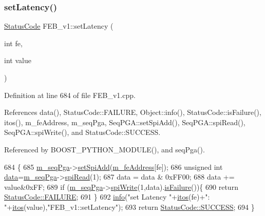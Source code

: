 \subsubsection{\texorpdfstring{set\+Latency()}{setLatency()}}
{\footnotesize\ttfamily \hyperlink{classStatusCode}{Status\+Code} F\+E\+B\+\_\+v1\+::set\+Latency (\begin{DoxyParamCaption}\item[{int}]{fe,  }\item[{int}]{value }\end{DoxyParamCaption})}



Definition at line 684 of file F\+E\+B\+\_\+v1.\+cpp.



References data(), Status\+Code\+::\+F\+A\+I\+L\+U\+RE, Object\+::info(), Status\+Code\+::is\+Failure(), itos(), m\+\_\+fe\+Address, m\+\_\+seq\+Pga, Seq\+P\+G\+A\+::set\+Spi\+Add(), Seq\+P\+G\+A\+::spi\+Read(), Seq\+P\+G\+A\+::spi\+Write(), and Status\+Code\+::\+S\+U\+C\+C\+E\+SS.



Referenced by B\+O\+O\+S\+T\+\_\+\+P\+Y\+T\+H\+O\+N\+\_\+\+M\+O\+D\+U\+L\+E(), and seq\+Pga().


\begin{DoxyCode}
684                                                 \{
685   \hyperlink{classFEB__v1_a6c7804ac86796f233a8393043adf2e77}{m\_seqPga}->\hyperlink{classSeqPGA_ac998ce3a6d9b5f2e88cc8393f8c1df53}{setSpiAdd}(\hyperlink{classFEB__v1_a4e1945c2d5b434125f375e9d0fc6d99f}{m\_feAddress}[fe]);
686   \textcolor{keywordtype}{unsigned} \textcolor{keywordtype}{int} \hyperlink{classFEB__v1_a6bca4320bd3bbbc32efc81097f33421a}{data}=\hyperlink{classFEB__v1_a6c7804ac86796f233a8393043adf2e77}{m\_seqPga}->\hyperlink{classSeqPGA_ab3d0e5e5d4014bc7a92588a76b8713d4}{spiRead}(1);
687   data = data & 0xFF00;
688   data += value&0xFF;
689   \textcolor{keywordflow}{if} (\hyperlink{classFEB__v1_a6c7804ac86796f233a8393043adf2e77}{m\_seqPga}->\hyperlink{classSeqPGA_ad4421841ce4ce8b88ad13f63216f0743}{spiWrite}(1,data).\hyperlink{classStatusCode_a5dd22dc6eb2c52fc4cabc58f6dea2eb7}{isFailure}())\{
690     \textcolor{keywordflow}{return} \hyperlink{classStatusCode_a6f565cbeadc76d14c72f047e5e85eb4ba3da73d4c469762eb9d3c960368252b26}{StatusCode::FAILURE};
691   \}
692   \hyperlink{classObject_a644fd329ea4cb85f54fa6846484b84a8}{info}(\textcolor{stringliteral}{"set Latency "}+\hyperlink{Tools_8h_af330027dbdafb9a30768b3613c553e60}{itos}(fe)+\textcolor{stringliteral}{": "}+\hyperlink{Tools_8h_af330027dbdafb9a30768b3613c553e60}{itos}(value),\textcolor{stringliteral}{"FEB\_v1::setLatency"});
693   \textcolor{keywordflow}{return} \hyperlink{classStatusCode_a6f565cbeadc76d14c72f047e5e85eb4badd0da38d3ba0d922efd1f4619bc37ad8}{StatusCode::SUCCESS};
694 \}
\end{DoxyCode}
\mbox{\label{classFEB__v1_abf7b8a0e6842ecf74a2b1889fbb9a722}} 
